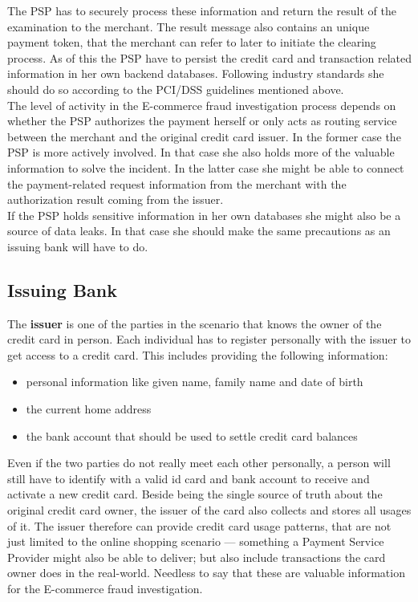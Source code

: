 The \gls{PSP} has to securely process these information and return the result of the examination to the merchant. The result message also contains an unique payment token, that the merchant can refer to later to initiate the clearing process. As of this the \gls{PSP} have to persist the credit card and transaction related information in her own backend databases. Following industry standards she should do so according to the PCI/DSS guidelines mentioned above.\\

The level of activity in the E-commerce fraud investigation process depends on whether the \gls{PSP} authorizes the payment herself or only acts as routing service between the merchant and the original credit card issuer. In the former case the \gls{PSP} is more actively involved. In that case she also holds more of the valuable information to solve the incident. In the latter case she might be able to connect the payment-related request information from the merchant with the authorization result coming from the issuer.\\

If the \gls{PSP} holds sensitive information in her own databases she might also be a source of data leaks. In that case she should make the same precautions as an issuing bank will have to do.


\subsection{Issuing Bank}
\label{subsec:stakeholder_issuer}

The \textbf{issuer} is one of the parties in the scenario that knows the owner of the credit card in person. Each individual has to register personally with the issuer to get access to a credit card. This includes providing the following information:\@

\begin{itemize}
		\item personal information like given name, family name and date of birth
		\item the current home address
		\item the bank account that should be used to settle credit card balances
\end{itemize}

Even if the two parties do not really meet each other personally, a person will still have to identify with a valid id card and bank account to receive and activate a new credit card. Beside being the single source of truth about the original credit card owner, the issuer of the card also collects and stores all  usages of it. The issuer therefore can provide credit card usage patterns, that are not just limited to the online shopping scenario --- something a Payment Service Provider might also be able to deliver; but also include transactions the card owner does in the real-world. Needless to say that these are valuable information for the E-commerce fraud investigation. \\

